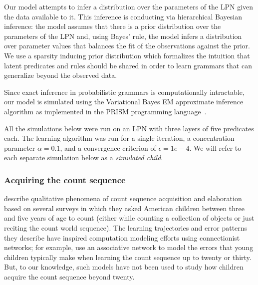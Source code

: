 \documentclass[10pt,letterpaper]{article}
\begin{document}
Our model attempts to infer a distribution over the parameters of the
LPN given the data available to it. This inference is conducting via
hierarchical Bayesian inference: the model assumes that there is a
prior distribution over the parameters of the LPN and, using Bayes'
rule, the model infers a distribution over parameter values that
balances the fit of the observations against the prior. We use a
sparsity inducing prior distribution which formalizes the intuition
that latent predicates and rules should be shared in order to learn
grammars that can generalize beyond the observed data.

Since exact inference in probabilistic grammars is computationally
intractable, our model is simulated using the Variational Bayes EM
approximate inference algorithm as implemented in the PRISM
programming language~\citep{sato2008variational}.

All the simulations below were run on an LPN with three layers of five
predicates each. The learning algorithm was run for a single
iteration, a concentration parameter $\alpha=0.1$, and a convergence
criterion of $\epsilon=1e-4$. We will refer to each separate
simulation below as a \emph{simulated child}.

\subsubsection{Acquiring the count sequence}

\citeauthor{FusRicBriar1982} describe qualitative phenomena of
count sequence acquisition and elaboration based on several surveys in
which they asked American children between three and five years of age
to count (either while counting a collection of objects or just
reciting the count world sequence). The learning trajectories and
error patterns they describe have inspired computation modeling
efforts using connectionist networks; for example,
\citet{ma1989modeling} use an associative network to model the errors
that young children typically make when learning the count sequence up
to twenty or thirty. But, to our knowledge, such models have not been
used to study how children acquire the count sequence beyond twenty.
\end{document}
